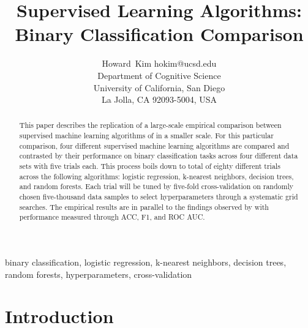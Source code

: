 \documentclass[twoside,11pt]{article}
\begin{document}
\title{Supervised Learning Algorithms: Binary Classification Comparison}

\author{\name Howard\ Kim \email hokim@ucsd.edu \\
       \addr Department of Cognitive Science\\
       University of California, San Diego\\
       La Jolla, CA 92093-5004, USA}
       

\maketitle

\begin{abstract}%
This paper describes the replication of a large-scale empirical 
comparison between supervised machine learning algorithms of \citet{cnm:06} 
in a smaller scale.  For this particular comparison, four different 
supervised machine learning algorithms are compared and contrasted by their 
performance on binary classification tasks across four different data sets 
with five trials each.  This process boils down to total of eighty different 
trials across the following algorithms: logistic regression, k-nearest 
neighbors, decision trees, and random forests.  Each trial will be tuned by 
five-fold cross-validation on randomly chosen five-thousand data samples to 
select hyperparameters through a systematic grid searches. The empirical results  
are in parallel to the findings observed by \citet{cnm:06} with 
performance measured through ACC, F1, and ROC AUC.
\end{abstract}

\begin{keywords}
  binary classification, logistic regression, k-nearest neighbors, decision 
  trees, random forests, hyperparameters, cross-validation
  \\
\end{keywords}

\section{Introduction}
\end{document}
